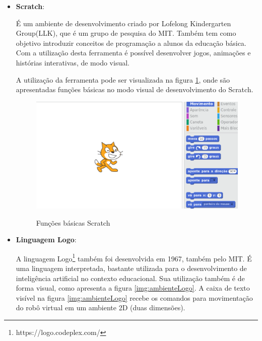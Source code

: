 \begin{itemize}
	\item \textbf{Scratch}: 

		É um ambiente de desenvolvimento criado por Lofelong Kindergarten Group(LLK), que é um grupo de pesquisa do MIT. Também tem como objetivo introduzir conceitos de programação a alunos da educação básica. Com a utilização desta ferramenta é possível desenvolver jogos, animações e histórias interativas, de modo visual.

		A utilização da ferramenta pode ser visualizada na figura \ref{img:funcoesBasicasScratch}, onde são apresentadas funções básicas no modo visual de desenvolvimento do Scratch.

		\begin{figure}[H]
			\centering
			\caption{Funções básicas Scratch}
			\includegraphics[scale=0.7]{figuras/funcoesBasicasSratch.eps}
			\label{img:funcoesBasicasScratch}
		\end{figure}		


	\item \textbf{Linguagem Logo}:

		A linguagem Logo\footnote{https://logo.codeplex.com/} também foi desenvolvida em 1967, também pelo MIT. É uma linguagem interpretada, bastante utilizada para o desenvolvimento de inteligência artificial no contexto educacional. Sua utilização também é de forma visual, como apresenta a figura \ref{img:ambienteLogo}. A caixa de texto visível na figura \ref{img:ambienteLogo} recebe os comandos para movimentação do robô virtual em um ambiente 2D (duas dimensões).


\end{itemize}
